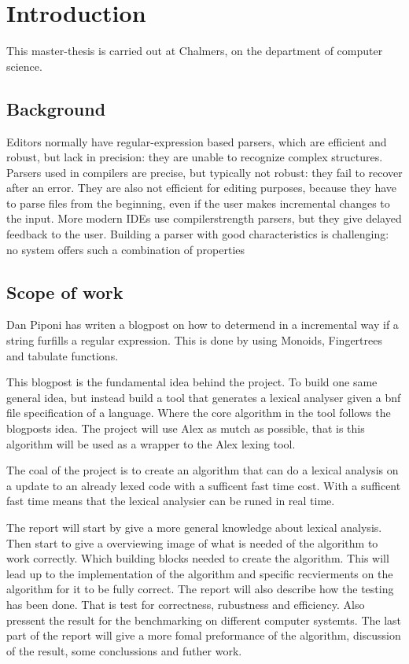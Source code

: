 \chapter{Introduction}
This master-thesis is carried out at Chalmers, on the department of computer science. 

\section{Background}
Editors normally have regular-expression based parsers, which are efficient and robust,
but lack in precision: they are unable to recognize complex structures. Parsers used in
compilers are precise, but typically not robust: they fail to recover after an error. They are
also not efficient for editing purposes, because they have to parse files from the beginning,
even if the user makes incremental changes to the input. More modern IDEs use compilerstrength
parsers, but they give delayed feedback to the user. Building a parser with good
characteristics is challenging: no system offers such a combination of properties

\section{Scope of work}
Dan Piponi has writen a blogpost on how to determend in a incremental way if a string furfills a regular expression. This is done by using Monoids, Fingertrees and tabulate functions. \cite{blog}

This blogpost is the fundamental idea behind the project. To build one same general idea, but instead build a tool that generates a lexical analyser given a bnf file specification of a language. Where the core algorithm in the tool follows the blogposts idea. The project will use Alex \cite{alex} as mutch as possible, that is this algorithm will be used as a wrapper to the Alex lexing tool.  

The coal of the project is to create an algorithm that can do a lexical analysis on a update to an already lexed code with a sufficent fast time cost. With a sufficent fast time means that the lexical analysier can be runed in real time.

The report will start by give a more general knowledge about lexical analysis. Then start to give a overviewing image of what is needed of the algorithm to work correctly. Which building blocks needed to create the algorithm. This will lead up to the implementation of the algorithm and specific recvierments on the algorithm for it to be fully correct. The report will also describe how the testing has been done. That is test for correctness, rubustness and efficiency. Also pressent the result for the benchmarking on different computer systemts. The last part of the report will give a more fomal preformance of the algorithm, discussion of the result, some conclussions and futher work.
